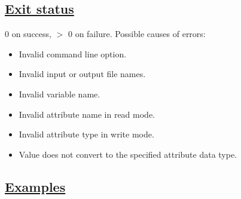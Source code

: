 \subsection*{\underline{Exit status}}


 0 on success, $>$ 0 on failure. Possible causes of errors: \begin{itemize}
\item  Invalid command line option. 
\item  Invalid input or output file names. 
\item  Invalid variable name. 
\item  Invalid attribute name in read mode. 
\item  Invalid attribute type in write mode. 
\item  Value does not convert to the specified attribute data type. 

\end{itemize}

\subsection*{\underline{Examples}}


